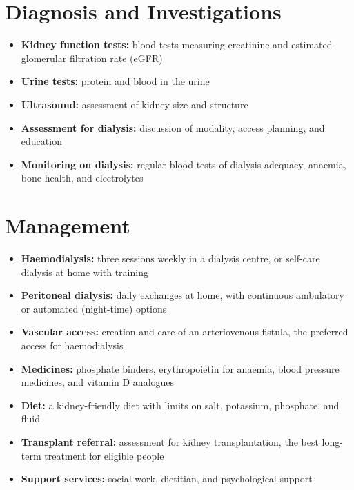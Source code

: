 \section*{Diagnosis and Investigations}
\begin{itemize}
    \item \textbf{Kidney function tests:} blood tests measuring creatinine and estimated glomerular filtration rate (eGFR)
    \item \textbf{Urine tests:} protein and blood in the urine
    \item \textbf{Ultrasound:} assessment of kidney size and structure
    \item \textbf{Assessment for dialysis:} discussion of modality, access planning, and education
    \item \textbf{Monitoring on dialysis:} regular blood tests of dialysis adequacy, anaemia, bone health, and electrolytes
\end{itemize}

\section*{Management}
\begin{itemize}
    \item \textbf{Haemodialysis:} three sessions weekly in a dialysis centre, or self-care dialysis at home with training
    \item \textbf{Peritoneal dialysis:} daily exchanges at home, with continuous ambulatory or automated (night-time) options
    \item \textbf{Vascular access:} creation and care of an arteriovenous fistula, the preferred access for haemodialysis
    \item \textbf{Medicines:} phosphate binders, erythropoietin for anaemia, blood pressure medicines, and vitamin D analogues
    \item \textbf{Diet:} a kidney-friendly diet with limits on salt, potassium, phosphate, and fluid
    \item \textbf{Transplant referral:} assessment for kidney transplantation, the best long-term treatment for eligible people
    \item \textbf{Support services:} social work, dietitian, and psychological support
\end{itemize}

